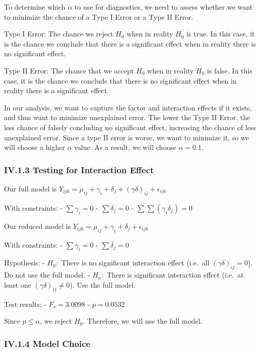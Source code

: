 \documentclass[
]{article}
\begin{document}
To determine which \(\alpha\) to use for diagnostics, we need to assess
whether we want to minimize the chance of a Type I Error or a Type II
Error.

Type I Error: The chance we reject \(H_0\) when in reality \(H_0\) is
true. In this case, it is the chance we conclude that there is a
significant effect when in reality there is no significant effect.

Type II Error: The chance that we accept \(H_0\) when in reality \(H_0\)
is false. In this case, it is the chance we conclude that there is no
significant effect when in reality there is a significant effect.

In our analysis, we want to capture the factor and interaction effects
if it exists, and thus want to minimize unexplained error. The lower the
Type II Error, the less chance of falsely concluding no significant
effect, increasing the chance of less unexplained error. Since a type II
error is worse, we want to minimize it, so we will choose a higher
\(\alpha\) value. As a result, we will choose \(\alpha = 0.1\).

\subsubsection{IV.1.3 Testing for Interaction
Effect}\label{iv.1.3-testing-for-interaction-effect}

Our full model is
\(Y_{ijk} = \mu_{ij} + \gamma_i + \delta_j + (\gamma\delta)_{ij} + \epsilon_{ijk}\)

With constraints: - \(\sum \gamma_i = 0\) - \(\sum \delta_j = 0\) -
\(\sum \sum (\gamma_i \delta_j) = 0\)

Our reduced model is
\(Y_{ijk} = \mu_{ij} + \gamma_i + \delta_j + \epsilon_{ijk}\)

With constraints: - \(\sum \gamma_i = 0\) - \(\sum \delta_j = 0\)

Hypothesis: - \(H_0:\) There is no significant interaction effect
(i.e.~all \((\gamma\delta)_{ij} = 0\)). Do not use the full model. -
\(H_a:\) There is significant interaction effect (i.e.~at least one
\((\gamma\delta)_{ij} \neq 0\)). Use the full model.

Test results: - \(F_s = 3.0098\) - \(p = 0.0532\)

Since \(p \leq \alpha\), we reject \(H_0\). Therefore, we will use the
full model.

\subsubsection{IV.1.4 Model Choice}\label{iv.1.4-model-choice}
\end{document}
